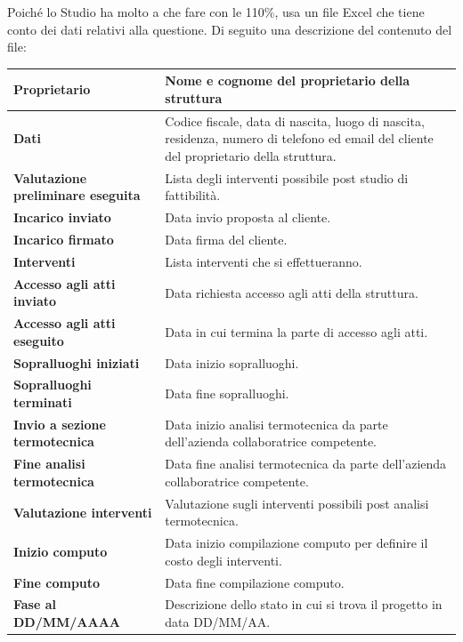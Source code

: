 \documentclass{elegantbook}
\begin{document}
	Poiché lo Studio ha molto a che fare con le 110\%, usa un file Excel che tiene conto dei dati relativi alla questione. Di seguito una descrizione del contenuto del file:
        \begin{center}
		\begin{longtable}{|l|p{10cm}|}
			\hline
			\textbf{Proprietario} & Nome e cognome del proprietario della struttura\\
			\hline
			\textbf{Dati} & Codice fiscale, data di nascita, luogo di nascita, residenza, numero di telefono ed email del cliente del proprietario della struttura.\\
			\hline
			\textbf{Valutazione preliminare eseguita} & Lista degli interventi possibile post studio di fattibilità.\\
			\hline
			\textbf{Incarico inviato} & Data invio proposta al cliente.\\
			\hline
			\textbf{Incarico firmato} & Data firma del cliente.\\
			\hline
			\textbf{Interventi} & Lista interventi che si effettueranno.  \\
			\hline
			\textbf{Accesso agli atti inviato} & Data richiesta accesso agli atti della struttura.\\
			\hline
			\textbf{Accesso agli atti eseguito} &  Data in cui termina la parte di accesso agli atti.\\
			\hline
			\textbf{Sopralluoghi iniziati} & Data inizio sopralluoghi.\\
			\hline
			\textbf{Sopralluoghi terminati} & Data fine sopralluoghi. \\
			\hline
			\textbf{Invio a sezione termotecnica} & Data inizio analisi termotecnica da parte dell'azienda collaboratrice competente. \\
			\hline
			\textbf{Fine analisi termotecnica} & Data fine analisi termotecnica da parte dell'azienda collaboratrice competente.\\
			\hline
			\textbf{Valutazione interventi} & Valutazione sugli interventi possibili post analisi termotecnica.\\
			\hline
			\textbf{Inizio computo} & Data inizio compilazione computo per definire il costo degli interventi.\\
			\hline
			\textbf{Fine computo} & Data fine compilazione computo.\\
			\hline
			\textbf{Fase al DD/MM/AAAA} & Descrizione dello stato in cui si trova il progetto in data DD/MM/AA. \\
			\hline	
		\end{longtable}
	\end{center}
	\newpage
\end{document}
